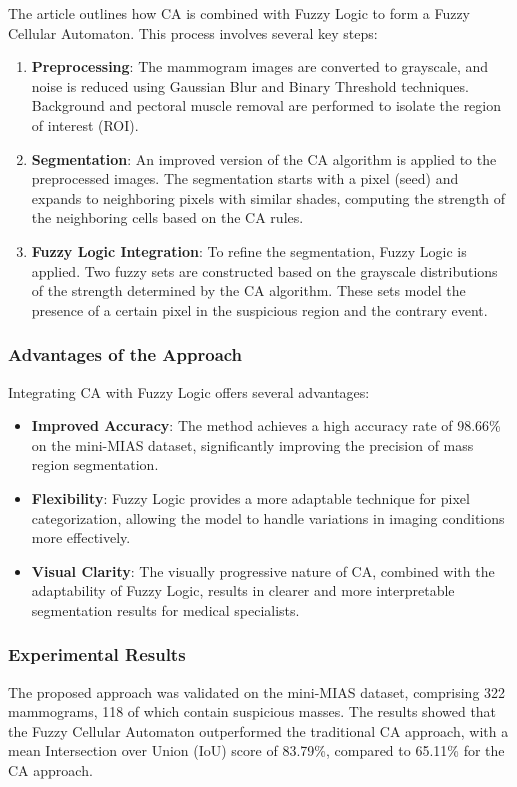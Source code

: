 \documentclass[9pt,a4paper,twoside]{tau-class/tau}
\begin{document}
The article outlines how CA is combined with Fuzzy Logic to form a Fuzzy Cellular Automaton. This process involves several key steps:

\begin{enumerate}
    \item \textbf{Preprocessing}: The mammogram images are converted to grayscale, and noise is reduced using Gaussian Blur and Binary Threshold techniques. Background and pectoral muscle removal are performed to isolate the region of interest (ROI).

    \item \textbf{Segmentation}: An improved version of the CA algorithm is applied to the preprocessed images. The segmentation starts with a pixel (seed) and expands to neighboring pixels with similar shades, computing the strength of the neighboring cells based on the CA rules. 

    \item \textbf{Fuzzy Logic Integration}: To refine the segmentation, Fuzzy Logic is applied. Two fuzzy sets are constructed based on the grayscale distributions of the strength determined by the CA algorithm. These sets model the presence of a certain pixel in the suspicious region and the contrary event.
\end{enumerate}

\subsubsection{Advantages of the Approach}

Integrating CA with Fuzzy Logic offers several advantages:

\begin{itemize}
    \item \textbf{Improved Accuracy}: The method achieves a high accuracy rate of 98.66\% on the mini-MIAS dataset, significantly improving the precision of mass region segmentation.
    \item \textbf{Flexibility}: Fuzzy Logic provides a more adaptable technique for pixel categorization, allowing the model to handle variations in imaging conditions more effectively.
    \item \textbf{Visual Clarity}: The visually progressive nature of CA, combined with the adaptability of Fuzzy Logic, results in clearer and more interpretable segmentation results for medical specialists.
\end{itemize}

\subsubsection{Experimental Results}

The proposed approach was validated on the mini-MIAS dataset, comprising 322 mammograms, 118 of which contain suspicious masses. The results showed that the Fuzzy Cellular Automaton outperformed the traditional CA approach, with a mean Intersection over Union (IoU) score of 83.79\%, compared to 65.11\% for the CA approach.


\printbibliography
\end{document}
